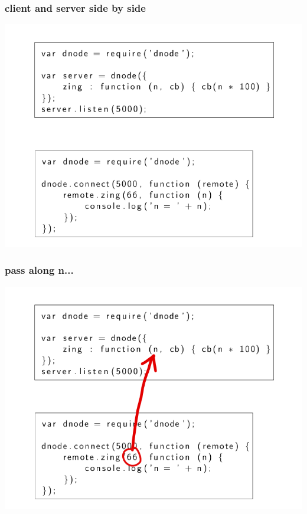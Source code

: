 \documentclass{beamer}
\begin{document}
\begin{frame}
    \frametitle{client and server side by side}
    \includegraphics[scale=0.6]{images/zing_flow_0.png}
\end{frame}

\begin{frame}
    \frametitle{pass along n...}
    \includegraphics[scale=0.6]{images/zing_flow_1.png}
\end{frame}
\end{document}

